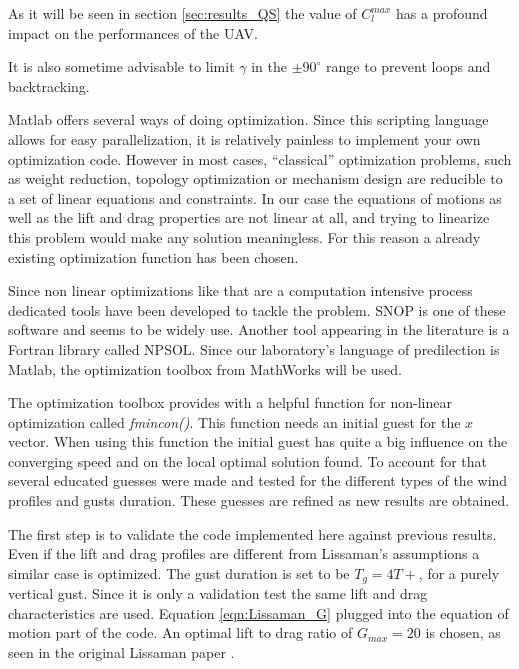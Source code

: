 As it will be seen in section \ref{sec:results_QS} the value of $C_l^{max}$ has a profound impact on the performances of the UAV.

\par It is also sometime advisable to limit $\gamma$ in the $\pm 90^{\circ}$ range to prevent loops and backtracking.


Matlab offers several ways of doing optimization.
Since this scripting language allows for easy parallelization, it is relatively painless to implement your own optimization code.
However in most cases, ``classical'' optimization problems, such as weight reduction, topology optimization or mechanism design are reducible to a set of linear  equations and constraints.
In our case the equations of motions as well as the lift and drag properties are not linear at all, and trying to linearize this problem would make any solution meaningless.
For this reason a already existing optimization function has been chosen.

\par Since non linear optimizations like that are a computation intensive process dedicated tools have been developed to tackle the problem.
SNOP is one of these software and seems to be widely use.
Another tool appearing in the literature is a Fortran library called NPSOL.
Since our laboratory's language of predilection is Matlab, the optimization toolbox from MathWorks will be used.

\par The optimization toolbox provides with a helpful function for non-linear optimization called \emph{fmincon()}.
This function needs an initial guest for the $x$ vector.
When using this function the initial guest has quite a big influence on the converging speed and on the local optimal solution found.
To account for that several educated guesses were made and tested for the different types of the wind profiles and gusts duration.
These guesses are refined as new results are obtained.


 \label{sec:results_QS}

The first step is to validate the code implemented here against previous results. 
Even if the lift and drag profiles are different from Lissaman's assumptions a similar case is optimized.
The gust duration is set to be $T_g=4 T+$, for a purely vertical gust.
Since it is only a validation test the same lift and drag characteristics are used. Equation \ref{eqn:Lissaman_G} plugged into the equation of motion part of the code. An optimal lift to drag ratio of $G_{max}=20$ is chosen, as seen in the original Lissaman paper \cite{Lissaman2007neutral}.

